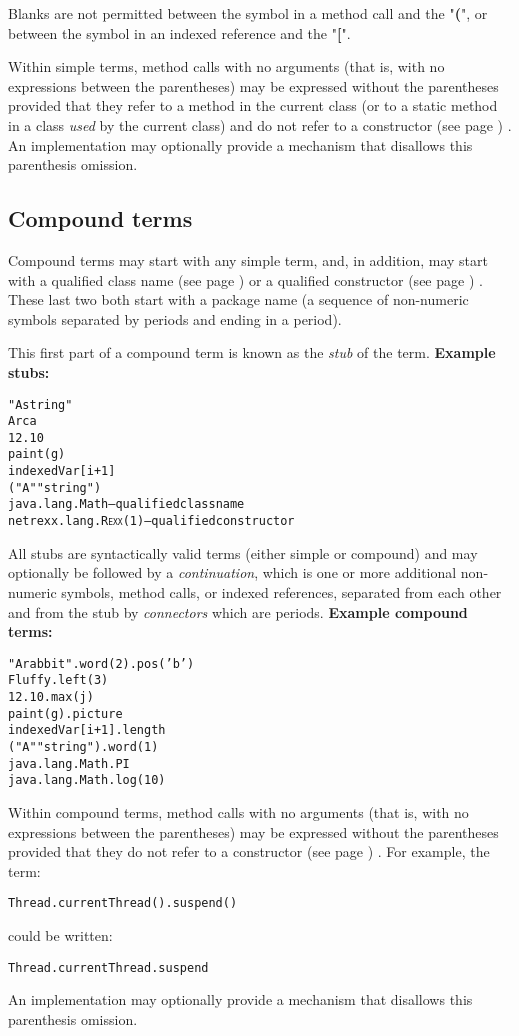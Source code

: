 Blanks are not permitted between the symbol in a method call and the
"\textbf{(}", or between the symbol in an indexed reference and
the "\textbf{[}".
 
Within simple terms, method calls with no arguments (that is, with no
expressions between the parentheses) may be expressed without the
parentheses provided that they refer to a method in the current class
(or to a static method in a class \emph{used} by the current class)
and do not refer to a  constructor (see page \pageref{refcons}) .
An implementation may optionally provide a mechanism that disallows this
parenthesis omission.
\subsection{Compound terms}\label{refcomterm}
 
Compound terms may start with any simple term, and, in addition, may
start with a  qualified class name (see page \pageref{refpackage})  or a
 qualified constructor (see page \pageref{refmethcon}) .
These last two both start with a package name (a sequence of non-numeric
symbols separated by periods and ending in a period).
 
This first part of a compound term is known as the \emph{stub} of the
term.
 \textbf{Example stubs:}
\begin{alltt}
"A string"
Arca
12.10
paint(g)
indexedVar[i+1]
("A" "string")
java.lang.Math        -- qualified class name
netrexx.lang.R\textsc{exx}(1)  -- qualified constructor
\end{alltt}
 
All stubs are syntactically valid terms (either simple or compound) and
may optionally be followed by a \emph{continuation}, which is one or
more additional non-numeric symbols, method calls, or indexed
references, separated from each other and from the stub by
\emph{connectors} which are periods.
 \textbf{Example compound terms:}
\begin{alltt}
"A rabbit".word(2).pos('b')
Fluffy.left(3)
12.10.max(j)
paint(g).picture
indexedVar[i+1].length
("A" "string").word(1)
java.lang.Math.PI
java.lang.Math.log(10)
\end{alltt}
 
Within compound terms, method calls with no arguments (that is, with no
expressions between the parentheses) may be expressed without the
parentheses provided that they do not refer to a
 constructor (see page \pageref{refcons}) .
For example, the term:
\begin{alltt}
Thread.currentThread().suspend()
\end{alltt}
could be written:
\begin{alltt}
Thread.currentThread.suspend
\end{alltt}
An implementation may optionally provide a mechanism that disallows this
parenthesis omission.
